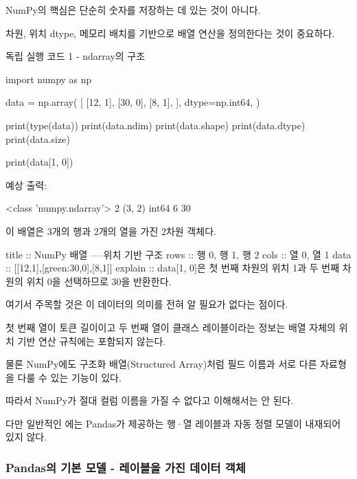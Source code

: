 NumPy의 핵심은 단순히 숫자를 저장하는 데 있는 것이 아니다.

차원, 위치 dtype, 메모리 배치를 기반으로 배열 연산을 정의한다는 것이 중요하다.

\begin{dhknote}
\begin{dhksmry}[centered]
독립 실행 코드 1 - ndarray의 구조
\end{dhksmry}
\end{dhknote}

\begin{dhkcode}
import numpy as np

data = np.array(
    [
        [12, 1],
        [30, 0],
        [8, 1],
    ],
    dtype=np.int64,
)

print(type(data))
print(data.ndim)
print(data.shape)
print(data.dtype)
print(data.size)

print(data[1, 0])
\end{dhkcode}

예상 출력:

\begin{dhkzsh}
<class 'numpy.ndarray'>
2
(3, 2)
int64
6
30
\end{dhkzsh}

이 배열은 3개의 행과 2개의 열을 가진 2차원 객체다.

\begin{dhkmatrix}[delim=none,style=cards]
title :: NumPy 배열 — 위치 기반 구조
rows :: 행 0, 행 1, 행 2
cols :: 열 0, 열 1
data :: [[12,1],[green:30,0],[8,1]]
explain :: data[1, 0]은 첫 번째 차원의 위치 1과 두 번째 차원의 위치 0을 선택하므로 30을 반환한다.
\end{dhkmatrix}

여기서 주목할 것은 이 데이터의 의미를 전혀 알 필요가 없다는 점이다.

첫 번째 열이 토큰 길이이고 두 번째 열이 클래스 레이블이라는 정보는 배열 자체의 위치 기반 연산 규칙에는 포함되지 않는다.

물론 NumPy에도 구조화 배열(Structured Array)처럼 필드 이름과 서로 다른 자료형을 다룰 수 있는 기능이 있다.

따라서 NumPy가 절대 컬럼 이름을 가질 수 없다고 이해해서는 안 된다.

다만 일반적인 에는 Pandas가 제공하는 행·열 레이블과 자동 정렬 모델이 내재되어 있지 않다.

\subsubsection{Pandas의 기본 모델 - 레이블을 가진 데이터 객체}

